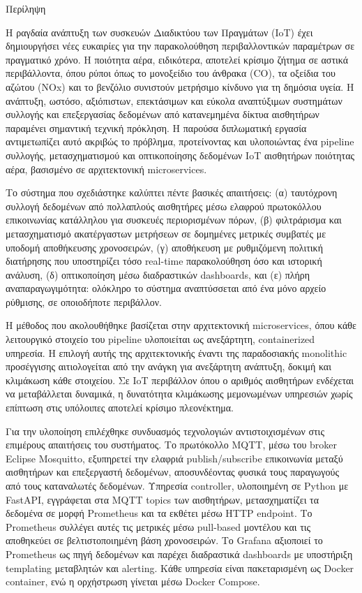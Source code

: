 \pagestyle{plain}
\begin{center}
{\LARGE Περίληψη}\\[1cm]
\end{center}

Η ραγδαία ανάπτυξη των συσκευών Διαδικτύου των Πραγμάτων (IoT) έχει δημιουργήσει νέες ευκαιρίες για την παρακολούθηση περιβαλλοντικών παραμέτρων σε πραγματικό χρόνο. Η ποιότητα αέρα, ειδικότερα, αποτελεί κρίσιμο ζήτημα σε αστικά περιβάλλοντα, όπου ρύποι όπως το μονοξείδιο του άνθρακα (CO), τα οξείδια του αζώτου (NOx) και το βενζόλιο συνιστούν μετρήσιμο κίνδυνο για τη δημόσια υγεία. Η ανάπτυξη, ωστόσο, αξιόπιστων, επεκτάσιμων και εύκολα αναπτύξιμων συστημάτων συλλογής και επεξεργασίας δεδομένων από κατανεμημένα δίκτυα αισθητήρων παραμένει σημαντική τεχνική πρόκληση. Η παρούσα διπλωματική εργασία αντιμετωπίζει αυτό ακριβώς το πρόβλημα, προτείνοντας και υλοποιώντας ένα pipeline συλλογής, μετασχηματισμού και οπτικοποίησης δεδομένων IoT αισθητήρων ποιότητας αέρα, βασισμένο σε αρχιτεκτονική microservices.

Το σύστημα που σχεδιάστηκε καλύπτει πέντε βασικές απαιτήσεις: (α) ταυτόχρονη συλλογή δεδομένων από πολλαπλούς αισθητήρες μέσω ελαφρού πρωτοκόλλου επικοινωνίας κατάλληλου για συσκευές περιορισμένων πόρων, (β) φιλτράρισμα και μετασχηματισμό ακατέργαστων μετρήσεων σε δομημένες μετρικές συμβατές με υποδομή αποθήκευσης χρονοσειρών, (γ) αποθήκευση με ρυθμιζόμενη πολιτική διατήρησης που υποστηρίζει τόσο real-time παρακολούθηση όσο και ιστορική ανάλυση, (δ) οπτικοποίηση μέσω διαδραστικών dashboards, και (ε) πλήρη αναπαραγωγιμότητα: ολόκληρο το σύστημα αναπτύσσεται από ένα μόνο αρχείο ρύθμισης, σε οποιοδήποτε περιβάλλον.

Η μέθοδος που ακολουθήθηκε βασίζεται στην αρχιτεκτονική microservices, όπου κάθε λειτουργικό στοιχείο του pipeline υλοποιείται ως ανεξάρτητη, containerized υπηρεσία. Η επιλογή αυτής της αρχιτεκτονικής έναντι της παραδοσιακής monolithic προσέγγισης αιτιολογείται από την ανάγκη για ανεξάρτητη ανάπτυξη, δοκιμή και κλιμάκωση κάθε στοιχείου. Σε IoT περιβάλλον όπου ο αριθμός αισθητήρων ενδέχεται να μεταβάλλεται δυναμικά, η δυνατότητα κλιμάκωσης μεμονωμένων υπηρεσιών χωρίς επίπτωση στις υπόλοιπες αποτελεί κρίσιμο πλεονέκτημα.

Για την υλοποίηση επιλέχθηκε συνδυασμός τεχνολογιών αντιστοιχισμένων στις επιμέρους απαιτήσεις του συστήματος. Το πρωτόκολλο MQTT, μέσω του broker Eclipse Mosquitto, εξυπηρετεί την ελαφριά publish/subscribe επικοινωνία μεταξύ αισθητήρων και επεξεργαστή δεδομένων, αποσυνδέοντας φυσικά τους παραγωγούς από τους καταναλωτές δεδομένων. Υπηρεσία controller, υλοποιημένη σε Python με FastAPI, εγγράφεται στα MQTT topics των αισθητήρων, μετασχηματίζει τα δεδομένα σε μορφή Prometheus και τα εκθέτει μέσω HTTP endpoint. Το Prometheus συλλέγει αυτές τις μετρικές μέσω pull-based μοντέλου και τις αποθηκεύει σε βελτιστοποιημένη βάση χρονοσειρών. Το Grafana αξιοποιεί το Prometheus ως πηγή δεδομένων και παρέχει διαδραστικά dashboards με υποστήριξη templating μεταβλητών και alerting. Κάθε υπηρεσία είναι πακεταρισμένη ως Docker container, ενώ η ορχήστρωση γίνεται μέσω Docker Compose.

